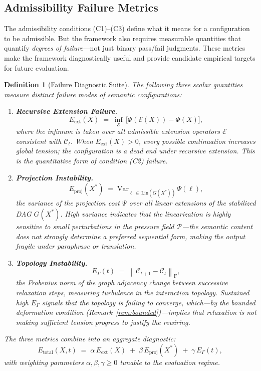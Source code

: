 \documentclass[11pt, a4paper]{article}
\theoremstyle{srn}
\newtheorem{definition}{Definition}[section]
\theoremstyle{srnremark}
\newcommand{\Cstruct}{\mathcal{C}}           %
\newcommand{\Phiten}{\varPhi}            %
\begin{document}
\subsection{Admissibility Failure Metrics}

The admissibility conditions (C1)--(C3) define what it means for a
configuration to be admissible.
But the framework also requires measurable quantities that quantify
\emph{degrees of failure}---not just binary pass/fail judgments.
These metrics make the framework diagnostically useful and provide
candidate empirical targets for future evaluation.

\begin{definition}[Failure Diagnostic Suite]
\label{def:failure}
The following three scalar quantities measure distinct failure modes
of semantic configurations:

\begin{enumerate}
  \item[\textbf{(F1)}] \textbf{Recursive Extension Failure.}
    \[
      E_{\mathrm{ext}}(X)
      \;=\;
      \inf_{\mathcal{E}}\,
      \bigl[\Phiten(\mathcal{E}(X)) - \Phiten(X)\bigr],
    \]
    where the infimum is taken over all admissible extension operators
    $\mathcal{E}$ consistent with $\Cstruct_t$.
    When $E_{\mathrm{ext}}(X) > 0$, every possible continuation
    increases global tension; the configuration is a dead end under
    recursive extension.
    This is the quantitative form of condition (C2) failure.

  \item[\textbf{(F2)}] \textbf{Projection Instability.}
    \[
      E_{\mathrm{proj}}(X^*)
      \;=\;
      \mathrm{Var}_{\ell \,\in\, \mathrm{Lin}(G(X^*))}\,
      \Psi(\ell),
    \]
    the variance of the projection cost $\Psi$ over all linear
    extensions of the stabilized DAG $G(X^*)$.
    High variance indicates that the linearization is highly sensitive
    to small perturbations in the pressure field $\mathcal{P}$---the
    semantic content does not strongly determine a preferred sequential
    form, making the output fragile under paraphrase or translation.

  \item[\textbf{(F3)}] \textbf{Topology Instability.}
    \[
      E_{\Gamma}(t)
      \;=\;
      \left\|\Cstruct_{t+1} - \Cstruct_t\right\|_{\mathrm{F}},
    \]
    the Frobenius norm of the graph adjacency change between successive
    relaxation steps, measuring turbulence in the interaction topology.
    Sustained high $E_{\Gamma}$ signals that the topology is failing to
    converge, which---by the bounded deformation condition
    (Remark~\ref{rem:bounded})---implies that relaxation is not making
    sufficient tension progress to justify the rewiring.
\end{enumerate}

The three metrics combine into an aggregate diagnostic:
\[
  E_{\mathrm{total}}(X, t)
  \;=\;
  \alpha\, E_{\mathrm{ext}}(X)
  \;+\;
  \beta\, E_{\mathrm{proj}}(X^*)
  \;+\;
  \gamma\, E_{\Gamma}(t),
\]
with weighting parameters $\alpha, \beta, \gamma \geq 0$ tunable to
the evaluation regime.
\end{definition}
\end{document}
